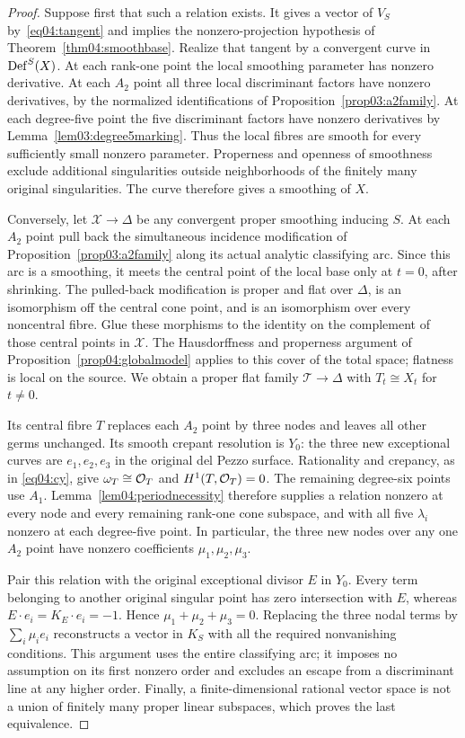 \begin{proof}
Suppose first that such a relation exists.  It gives a vector of
$V_S$ by~\eqref{eq04:tangent} and implies the nonzero-projection
hypothesis of Theorem~\ref{thm04:smoothbase}.  Realize that tangent
by a convergent curve in $\operatorname{Def}^S(X)$.  At each rank-one point the
local smoothing parameter has nonzero derivative.  At each $A_2$
point all three local discriminant factors have nonzero derivatives,
by the normalized identifications of
Proposition~\ref{prop03:a2family}.  At each degree-five point
the five discriminant factors have nonzero derivatives by
Lemma~\ref{lem03:degree5marking}.  Thus the local fibres are
smooth for every sufficiently small nonzero parameter.  Properness
and openness of smoothness exclude additional singularities outside
neighborhoods of the finitely many original singularities.  The
curve therefore gives a smoothing of $X$.

Conversely, let $\mathcal X\to\Delta$ be any convergent proper
smoothing inducing $S$.  At each $A_2$ point pull back the
simultaneous incidence modification of
Proposition~\ref{prop03:a2family} along its actual analytic
classifying arc.  Since this arc is a smoothing, it meets the
central point of the local base only at $t=0$, after shrinking.
The pulled-back modification is proper and flat over $\Delta$,
is an isomorphism off the central cone point, and is an isomorphism
over every noncentral fibre.  Glue these morphisms to the identity
on the complement of those central points in $\mathcal X$.  The
Hausdorffness and properness argument of
Proposition~\ref{prop04:globalmodel} applies to this cover of the
total space; flatness is local on the source.  We obtain a proper
flat family $\mathcal T\to\Delta$ with $T_t\cong X_t$ for
$t\ne0$.

Its central fibre $T$ replaces each $A_2$ point by three nodes and
leaves all other germs unchanged.  Its smooth crepant resolution is
$Y_0$: the three new exceptional curves are $e_1,e_2,e_3$ in the
original del Pezzo surface.  Rationality and crepancy, as in
\eqref{eq04:cy}, give $\omega_T\cong\mathcal{O}_T$ and
$H^1(T,\mathcal{O}_T)=0$.  The remaining degree-six points use $A_1$.
Lemma~\ref{lem04:periodnecessity} therefore supplies a relation
nonzero at every node and every remaining rank-one cone subspace,
and with all five $\lambda_i$ nonzero at each degree-five point.  In
particular, the three new nodes over any one $A_2$ point have
nonzero coefficients $\mu_1,\mu_2,\mu_3$.

Pair this relation with the original exceptional divisor $E$ in
$Y_0$.  Every term belonging to another original singular point has
zero intersection with $E$, whereas
$E\cdot e_i=K_E\cdot e_i=-1$.  Hence
$\mu_1+\mu_2+\mu_3=0$.  Replacing the three nodal terms by
$\sum_i\mu_i e_i$ reconstructs a vector in $K_S$ with all the
required nonvanishing conditions.  This argument uses the entire
classifying arc; it imposes no assumption on its first nonzero order
and excludes an escape from a discriminant line at any higher order.
Finally, a finite-dimensional rational vector space is not a union
of finitely many proper linear subspaces, which proves the last
equivalence.
\end{proof}

